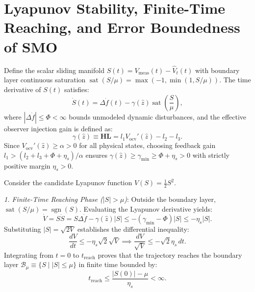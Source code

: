 \documentclass[balance,nocopyright,upint,varvw,hyphenate,barcolor=NavyBlue,nolists]{asmejour}
\begin{document}
\section{Lyapunov Stability, Finite-Time Reaching, and Error Boundedness of SMO\label{app:lyapunov}}
Define the scalar sliding manifold $S(t) = V_{\text{meas}}(t) - \hat{V}_t(t)$ with boundary layer continuous saturation $\operatorname{sat}(S/\mu) = \max(-1, \min(1, S/\mu))$. The time derivative of $S(t)$ satisfies:
\begin{equation}\label{eqn:app_s_dot}
\dot{S}(t) = \Delta \dot{f}(t) - \gamma(\hat{z}) \operatorname{sat}\left(\frac{S}{\mu}\right),
\end{equation}
where $|\Delta \dot{f}| \le \Phi < \infty$ bounds unmodeled dynamic disturbances, and the effective observer injection gain is defined as:
\begin{equation}\label{eqn:app_gamma}
\gamma(\hat{z}) \equiv \mathbf{H}\mathbf{L} = l_1 V_{\text{ocv}}'(\hat{z}) - l_2 - l_3.
\end{equation}
Since $V_{\text{ocv}}'(\hat{z}) \ge \alpha > 0$ for all physical states, choosing feedback gain $l_1 > (l_2 + l_3 + \Phi + \eta_s)/\alpha$ ensures $\gamma(\hat{z}) \ge \gamma_{\min} \ge \Phi + \eta_s > 0$ with strictly positive margin $\eta_s > 0$.

Consider the candidate Lyapunov function $V(S) = \frac{1}{2} S^2$.

\emph{1. Finite-Time Reaching Phase ($|S| > \mu$)}:
Outside the boundary layer, $\operatorname{sat}(S/\mu) = \operatorname{sgn}(S)$. Evaluating the Lyapunov derivative yields:
\begin{equation}\label{eqn:app_v_dot_reach}
\dot{V} = S \dot{S} = S \Delta \dot{f} - \gamma(\hat{z}) |S| \le -(\gamma_{\min} - \Phi)|S| \le -\eta_s |S|.
\end{equation}
Substituting $|S| = \sqrt{2V}$ establishes the differential inequality:
\begin{equation}\label{eqn:app_v_ineq}
\frac{dV}{dt} \le -\eta_s \sqrt{2} \sqrt{V} \implies \frac{dV}{\sqrt{V}} \le -\sqrt{2}\eta_s \, dt.
\end{equation}
Integrating from $t = 0$ to $t_{\text{reach}}$ proves that the trajectory reaches the boundary layer $\mathcal{B}_\mu \equiv \{S \mid |S| \le \mu\}$ in finite time bounded by:
\begin{equation}\label{eqn:app_treach}
t_{\text{reach}} \le \frac{|S(0)| - \mu}{\eta_s} < \infty.
\end{equation}
\end{document}
